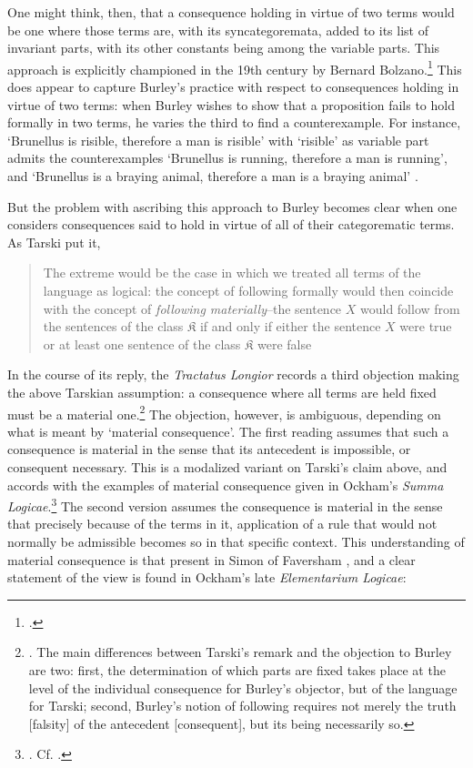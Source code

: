 	One might think, then, that a consequence holding in virtue of two terms would be one where those terms are, with its syncategoremata, added to its list of invariant parts, with its other constants being among the variable parts. This approach is explicitly championed in the 19th century by Bernard Bolzano.\footnote{\cite{George1986}.} This does appear to capture Burley's practice with respect to consequences holding in virtue of two terms: when Burley wishes to show that a proposition fails to hold formally in two terms, he varies the third to find a counterexample. For instance, `Brunellus is risible, therefore a man is risible' with `risible' as variable part admits the counterexamples `Brunellus is running, therefore a man is running', and `Brunellus is a braying animal, therefore a man is a braying animal' \autocite[84.13-15]{BurleyDPAL}. 
	
	But the problem with ascribing this approach to Burley becomes clear when one considers consequences said to hold in virtue of all of their categorematic terms. As Tarski put it, 
	\begin{quote}
		The extreme would be the case in which we treated all terms of the language as logical: the concept of following formally would then coincide with the concept of \textit{following materially}--the sentence $X$ would follow from the sentences of the class $\mathfrak{K}$ if and only if either the sentence $X$ were true or at least one sentence of the class $\mathfrak{K}$ were false \autocite[pp. 188-189]{Tarski2002}
	\end{quote}
	
	In the course of its reply, the \textit{Tractatus Longior} records a third objection making the above Tarskian assumption: a consequence where all terms are held fixed must be a material one.\footnote{\cite[p. 86.4-9]{BurleyDPAL}. The main differences between Tarski's remark and the objection to Burley are two: first, the determination of which parts are fixed takes place at the level of the individual consequence for Burley's objector, but of the language for Tarski; second, Burley's notion of following requires not merely the truth [falsity] of the antecedent [consequent], but its being necessarily so.} The objection, however, is ambiguous, depending on what is meant by `material consequence'. The first reading assumes that such a consequence is material in the sense that its antecedent is impossible, or consequent necessary. This is a modalized variant on Tarski's claim above, and accords with the examples of material consequence given in Ockham's \textit{Summa Logicae}.\footnote{\cite[III-3. 1, p. 589]{OckhamSL}. Cf. \cite[p. 7, par. 18; ]{Green-Pedersen1980a}.} The second version assumes the consequence is material in the sense that precisely because of the terms in it, application of a rule that would not normally be admissible becomes so in that specific context. This understanding of material consequence is that present in Simon of Faversham \autocite[q. 36]{FavershamQE}, and a clear statement of the view is found in Ockham's late \textit{Elementarium Logicae}:
	
